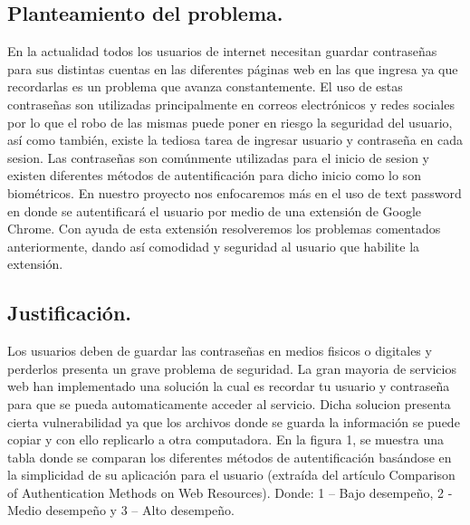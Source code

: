\documentclass[12pt, a4paper, titlepage]{article}
\begin{document}
		\subsection{Planteamiento del problema.}
			En la actualidad todos los usuarios de internet necesitan guardar contraseñas para sus distintas cuentas en las diferentes páginas web en las que ingresa ya que recordarlas es un problema que avanza constantemente. El uso de estas contraseñas son utilizadas principalmente en correos electrónicos y redes sociales por lo que el robo de las mismas puede poner en riesgo la seguridad del usuario, así como también, existe la tediosa tarea de ingresar usuario y contraseña en cada sesion. Las contraseñas son comúnmente utilizadas para el inicio de sesion y existen diferentes métodos de autentificación para dicho inicio como lo son biométricos. En nuestro proyecto nos enfocaremos más en el uso de text password en donde se autentificará el usuario por medio de una extensión de Google Chrome. Con ayuda de esta extensión resolveremos los problemas comentados anteriormente, dando así comodidad y seguridad al usuario que habilite la extensión.
		\newpage    
		\subsection{Justificación.}
			Los usuarios deben de guardar las contraseñas en medios fisicos o digitales y perderlos presenta un grave problema de seguridad. La gran mayoria de servicios web han implementado una solución la cual es recordar tu usuario y contraseña para que se pueda automaticamente acceder al servicio. Dicha solucion presenta cierta vulnerabilidad ya que los archivos donde se guarda la información se puede copiar y con ello replicarlo a otra computadora.
			En la figura 1, se muestra una tabla donde se comparan los diferentes métodos de autentificación basándose en la simplicidad de su aplicación para el usuario (extraída del artículo Comparison of Authentication Methods on Web Resources). Donde: 1 – Bajo desempeño, 2 - Medio desempeño y 3 – Alto desempeño.
			
\end{document}
